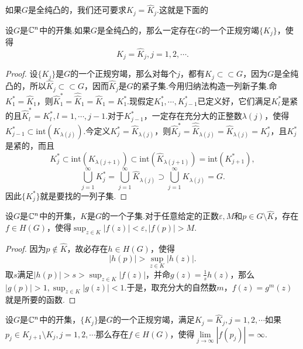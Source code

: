 如果$G$是全纯凸的，我们还可要求$K_j=\widehat{K}_j$.这就是下面的
\begin{lemma}\label{lem5.1.10}
	设$G$是$\mathbb C^n$中的开集.如果$G$是全纯凸的，那么一定存在$G$的一个正规穷竭$\{K_j\}$，使得
	\[K_j=\widehat{K}_j,j=1,2,\cdots.\]
\end{lemma}
\begin{proof}
	设$\{K_j\}$是$G$的一个正规穷竭，那么对每个$j$，都有$K_j\subset\subset G$，因为$G$是全纯凸的，所以$\widehat{K}_j\subset\subset G$，因而$\widehat{K}_j$是$G$的紧子集.今用归纳法构造一列新子集.命$K_1^\ast=\widehat{K}_1$，则$\widehat{K}_1^\ast=\widehat{\widehat{K}}_1=\widehat{K}_1=K_1^\ast$.现假定$K_1^\ast,\cdots,K_{j-1}^\ast$已定义好，它们满足$K_l^\ast$是紧的且$\widehat{K}_l^\ast=K_l^\ast,l=1,\cdots,j-1$.对于$K_{j-1}^\ast$，一定存在充分大的正整数$\lambda(j)$，使得$K_{j-1}^\ast \subset\mathrm{int}(K_{\lambda(j)})$.今定义$K_j^\ast=\widehat{K}_{\lambda(j)}$，则$\widehat{K}_j^\ast=\widehat{\widehat{K}}_{\lambda(j)}=\widehat{K}_{\lambda(j)}=K_j^\ast$，且$K_j^\ast$是紧的，而且
	\[K_j^\ast\subset\mathrm{int}(K_{\lambda(j+1)})\subset\mathrm{int}(\widehat{K}_{\lambda(j+1)})=\mathrm{int}(
	K_{j+1}^\ast),\]
	\[\bigcup_{j=1}^\infty K_j^\ast=\bigcup_{j=1}^\infty \widehat{K}_{\lambda(j)}\supset\bigcup_{j=1}^\infty K_{\lambda(j)}=G.\]
	因此$\{K_j^\ast\}$就是要找的一列子集.
\end{proof}
\begin{lemma}\label{lem5.1.11}
	设$G$是$\mathbb C^n$中的开集，$K$是$G$的一个子集.对于任意给定的正数$\varepsilon,M$和$p\in G\setminus\widehat{K}$，存在$f\in H(G)$，使得$\sup_{z\in K}|f(z)|<\varepsilon,|f(p)|>M$.
\end{lemma}
\begin{proof}
	因为$p\notin\widehat{K}$，故必存在$h\in H(G)$，使得
	\[|h(p)|>\sup_{z\in K}|h(z)|.\]
	取$s$满足$|h(p)|>s>\sup_{z\in K}|f(z)|$，并命$g(z)=\frac1s h(z)$，那么$|g(p)|>1,\sup_{z\in K}|g(z)|<1$.于是，取充分大的自然数$m$，$f(z)=g^m(z)$就是所要的函数.
\end{proof}
\begin{lemma}\label{lem5.1.12}
	设$G$是$\mathbb C^n$中的开集，$\{K_j\}$是$G$的一个正规穷竭，满足$K_j=\widehat{K}_j,j=1,2,\cdots$如果$p_j\in K_{j+1}\setminus K_j,j=1,2,\cdots$那么存在$f\in H(G)$，使得$\lim\limits_{j\to\infty}|f(p_j)|=\infty$.
\end{lemma}
